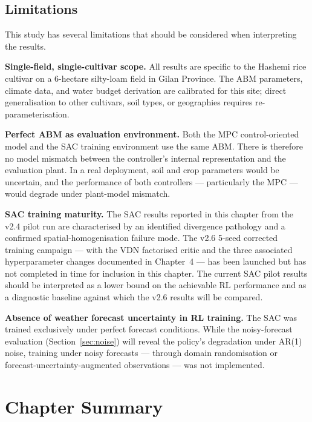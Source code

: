 \subsection{Limitations}

This study has several limitations that should be considered when interpreting the results.

\textbf{Single-field, single-cultivar scope.}
All results are specific to the Hashemi rice cultivar on a 6-hectare silty-loam field
in Gilan Province.  The ABM parameters, climate data, and water budget derivation are
calibrated for this site; direct generalisation to other cultivars, soil types, or
geographies requires re-parameterisation.

\textbf{Perfect ABM as evaluation environment.}
Both the MPC control-oriented model and the SAC training environment use the same ABM.
There is therefore no model mismatch between the controller's internal representation
and the evaluation plant.  In a real deployment, soil and crop parameters would be
uncertain, and the performance of both controllers — particularly the MPC — would
degrade under plant-model mismatch.

\textbf{SAC training maturity.}
The SAC results reported in this chapter from the v2.4 pilot run are characterised
by an identified divergence pathology and a confirmed spatial-homogenisation failure
mode. The v2.6 5-seed corrected training campaign — with the VDN factorised critic
and the three associated hyperparameter changes documented in Chapter~4 — has been
launched but has not completed in time for inclusion in this chapter. The current
SAC pilot results should be interpreted as a lower bound on the achievable RL
performance and as a diagnostic baseline against which the v2.6 results will be
compared.

\textbf{Absence of weather forecast uncertainty in RL training.}
The SAC was trained exclusively under perfect forecast conditions.  While the
noisy-forecast evaluation (Section~\ref{sec:noise}) will reveal the policy's
degradation under AR(1) noise, training under noisy forecasts — through domain
randomisation or forecast-uncertainty-augmented observations — was not implemented.

\section{Chapter Summary}
\label{sec:results_summary}

